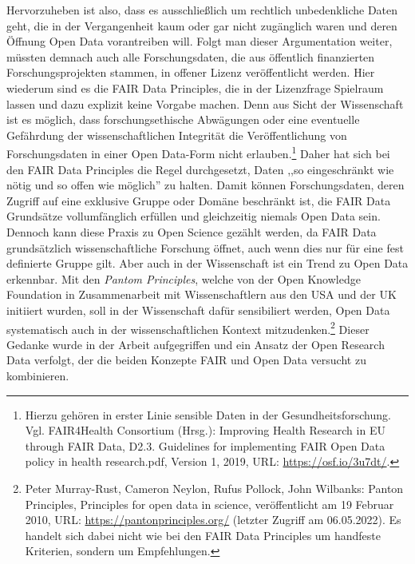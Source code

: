 Hervorzuheben ist also, dass es ausschließlich um rechtlich unbedenkliche Daten geht, die in der Vergangenheit kaum oder gar nicht zugänglich waren und deren Öffnung Open Data vorantreiben will. Folgt man dieser Argumentation weiter, müssten demnach auch alle Forschungsdaten, die aus öffentlich finanzierten Forschungsprojekten stammen, in offener Lizenz veröffentlicht werden. Hier wiederum sind es die FAIR Data Principles, die in der Lizenzfrage Spielraum lassen und dazu explizit keine Vorgabe machen. Denn aus Sicht der Wissenschaft ist es möglich, dass forschungsethische Abwägungen oder eine eventuelle Gefährdung der wissenschaftlichen Integrität die Veröffentlichung von Forschungsdaten in einer Open Data-Form nicht erlauben.\footnote{Hierzu gehören in erster Linie sensible Daten in der Gesundheitsforschung. Vgl. FAIR4Health Consortium (Hrsg.): Improving Health Research in EU through FAIR Data, D2.3. Guidelines for implementing FAIR Open Data policy in health research.pdf, Version 1, 2019, URL: \url{https://osf.io/3u7dt/}.} Daher hat sich bei den FAIR Data Principles die Regel durchgesetzt, Daten ,,so eingeschränkt wie nötig und so offen wie möglich'' zu halten. Damit können Forschungsdaten, deren Zugriff auf eine exklusive Gruppe oder Domäne beschränkt ist, die FAIR Data Grundsätze vollumfänglich erfüllen und gleichzeitig niemals Open Data sein. Dennoch kann diese Praxis zu Open Science gezählt werden, da FAIR Data grundsätzlich wissenschaftliche Forschung öffnet, auch wenn dies nur für eine fest definierte Gruppe gilt. Aber auch in der Wissenschaft ist ein Trend zu Open Data erkennbar. Mit den \textit{Pantom Principles}, welche von der Open Knowledge Foundation in Zusammenarbeit mit Wissenschaftlern aus den USA und der UK initiiert wurden, soll in der Wissenschaft dafür sensibiliert werden, Open Data systematisch auch in der wissenschaftlichen Kontext mitzudenken.\footnote{Peter Murray-Rust, Cameron Neylon, Rufus Pollock, John Wilbanks: Panton Principles, Principles for open data in science, veröffentlicht am 19 Februar 2010, URL: \url{https://pantonprinciples.org/} (letzter Zugriff am 06.05.2022). Es handelt sich dabei nicht wie bei den FAIR Data Principles um handfeste Kriterien, sondern um Empfehlungen.} Dieser Gedanke wurde in der Arbeit aufgegriffen und ein Ansatz der Open Research Data verfolgt, der die beiden Konzepte FAIR und Open Data versucht zu kombinieren.

